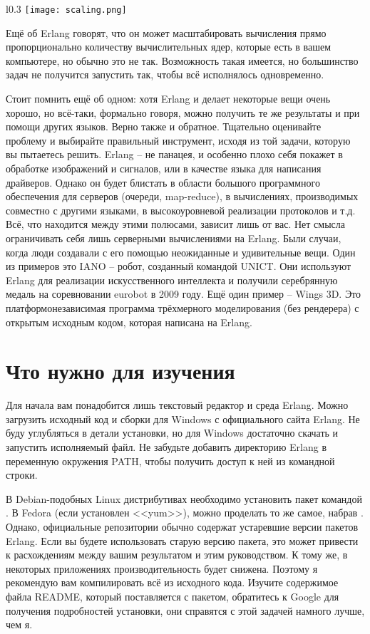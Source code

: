 \begin{wrapfigure}{l}{0.3\linewidth}
    \texttt{[image: scaling.png]}
\end{wrapfigure}
Ещё об Erlang говорят, что он может масштабировать вычисления прямо пропорционально количеству вычислительных ядер, которые есть в вашем компьютере, но обычно это не так.
Возможность такая имеется, но большинство задач не получится запустить так, чтобы всё исполнялось одновременно.

Стоит помнить ещё об одном: хотя Erlang и делает некоторые вещи очень хорошо, но всё\--таки, формально говоря, можно получить те же результаты и при помощи других языков.
Верно также и обратное.
Тщательно оценивайте проблему и выбирайте правильный инструмент, исходя из той задачи, которую вы пытаетесь решить.
Erlang \--- не панацея, и особенно плохо себя покажет в обработке изображений и сигналов, или в качестве языка для написания драйверов.
Однако он будет блистать в области большого программного обеспечения для серверов (очереди, map\--reduce), в вычислениях, производимых совместно с другими языками, в высокоуровневой реализации протоколов и т.д.
Всё, что находится между этими полюсами, зависит лишь от вас.
Нет смысла ограничивать себя лишь серверными вычислениями на Erlang.
Были случаи, когда люди создавали с его помощью неожиданные и удивительные вещи.
Один из примеров это IANO \--- робот, созданный командой UNICT.
Они используют Erlang для реализации искусственного интеллекта и получили серебрянную медаль на соревновании eurobot в 2009 году.
Ещё один пример \--- Wings 3D.
Это платформонезависимая программа трёхмерного моделирования (без рендерера) с открытым исходным кодом, которая написана на Erlang.

\section{Что нужно для изучения}
\label{what-you-need-to-dive-in}
Для начала вам понадобится лишь текстовый редактор и среда Erlang.
Можно загрузить исходный код и сборки для Windows с официального сайта Erlang.
Не буду углубляться в детали установки, но для Windows достаточно скачать и запустить исполняемый файл.
Не забудьте добавить директорию Erlang в переменную окружения PATH, чтобы получить доступ к ней из командной строки.

В Debian\--подобных Linux дистрибутивах необходимо установить пакет командой .
В Fedora (если установлен <<yum>>), можно проделать то же самое, набрав .
Однако, официальные репозитории обычно содержат устаревшие версии пакетов Erlang.
Если вы будете использовать старую версию пакета, это может привести к расхождениям между вашим результатом и этим руководством.
К тому же, в некоторых приложениях производительность будет снижена.
Поэтому я рекомендую вам компилировать всё из исходного кода.
Изучите содержимое файла README, который поставляется с пакетом, обратитесь к Google для получения подробностей установки, они справятся с этой задачей намного лучше, чем я.

